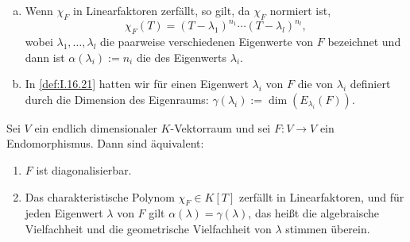 \begin{erinnerung}
	\label{erinnerung:2.7}
	\begin{enumerate}[(a)]
		\item Wenn $\chi_F$ in Linearfaktoren zerfällt, so gilt, da $\chi_F$ normiert ist,
		\[
			\chi_F(T) = (T-\lambda_1)^{n_1} \cdots (T-\lambda_l)^{n_l},
		\]
		wobei $\lambda_1,\dots,\lambda_l$ die paarweise verschiedenen Eigenwerte von $F$ bezeichnet und dann ist $\alpha(\lambda_i) := n_i$ die  des Eigenwerts $\lambda_i$.
		\item In \autoref{def:I.16.21} hatten wir für einen Eigenwert $\lambda_i$ von $F$ die  von $\lambda_i$ definiert durch die Dimension des Eigenraums: $\gamma(\lambda_i) := \dim(E_{\lambda_i}(F))$.
	\end{enumerate}
\end{erinnerung}

\begin{satz}
	\label{satz:2.8}
	Sei $V$ ein endlich dimensionaler $K$-Vektorraum und sei $F \colon V \rightarrow V$ ein Endomorphismus.
	Dann sind äquivalent:
	\begin{enumerate}[(1)]
		\item $F$ ist diagonalisierbar.
		\item Das charakteristische Polynom $\chi_F \in K[T]$ zerfällt in Linearfaktoren, und für jeden Eigenwert $\lambda$ von $F$ gilt $\alpha(\lambda) = \gamma(\lambda)$, das heißt die algebraische Vielfachheit und die geometrische Vielfachheit von $\lambda$ stimmen überein.
	\end{enumerate}
\end{satz}


